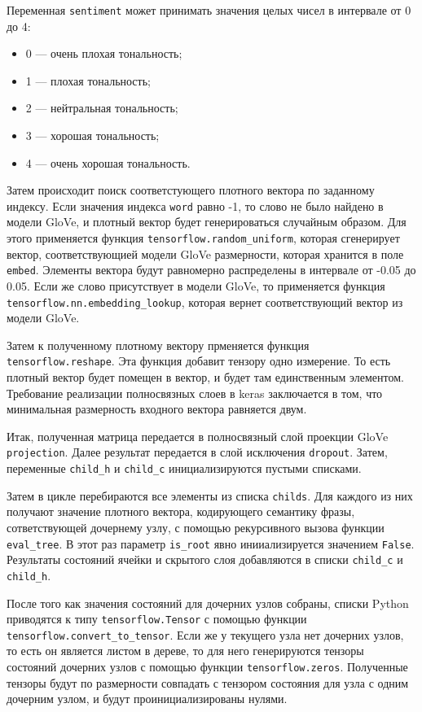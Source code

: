 Переменная \texttt{sentiment} может принимать значения целых чисел в интервале от 0 до 4:
\begin{itemize}
\item 0 --- очень плохая тональность;
\item 1 --- плохая тональность;
\item 2 --- нейтральная тональность;
\item 3 --- хорошая тональность;
\item 4 --- очень хорошая тональность.
\end{itemize}

Затем происходит поиск соответстующего плотного вектора по заданному индексу. Если значения индекса \texttt{word} равно -1, то слово не было найдено в модели GloVe, и плотный вектор будет генерироваться случайным образом. Для этого применяется функция \texttt{tensorflow.random\_uniform}, которая сгенерирует вектор, соответствующией модели GloVe размерности, которая хранится в поле \texttt{embed}. Элементы вектора будут равномерно распределены в интервале от -0.05 до 0.05. Если же слово присутствует в модели GloVe, то применяется функция \texttt{tensorflow.nn.embedding\_lookup}, которая вернет соответствующий вектор из модели GloVe.

Затем к полученному плотному вектору прменяется функция \texttt{tensor\-flow.reshape}. Эта функция добавит тензору одно измерение. То есть плотный вектор будет помещен в вектор, и будет там единственным элементом. Требование реализации полносвязных слоев в keras заключается в том, что минимальная размерность входного вектора равняется двум.

Итак, полученная матрица передается в полносвязный слой проекции GloVe \texttt{projection}. Далее результат передается в слой исключения \texttt{dropout}. Затем, переменные \texttt{child\_h} и \texttt{child\_c} инициализируются пустыми списками.

Затем в цикле перебираются все элементы из списка \texttt{childs}. Для каждого из них получают значение плотного вектора, кодирующего семантику фразы, сответствующей дочернему узлу, с помощью рекурсивного вызова функции \texttt{eval\_tree}. В этот раз параметр \texttt{is\_root} явно инииализируется значением \texttt{False}. Результаты состояний ячейки и скрытого слоя добавляются в списки \texttt{child\_c} и \texttt{child\_h}.

После того как значения состояний для дочерних узлов собраны, списки Python приводятся к типу \texttt{tensorflow.Tensor} с помощью функции \texttt{ten\-sorflow.convert\_to\_tensor}. Если же у текущего узла нет дочерних узлов, то есть он является листом в дереве, то для него генерируются тензоры состояний дочерних узлов с помощью функции \texttt{tensorflow.zeros}. Полученные тензоры будут по размерности совпадать с тензором состояния для узла с одним дочерним узлом, и будут проинициализированы нулями.

